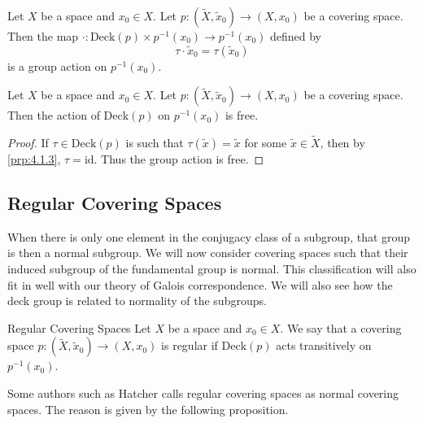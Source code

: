 \documentclass[a4paper]{article}
\begin{document}
\begin{prp}{}{} Let $X$ be a space and $x_0\in X$. Let $p:(\tilde{X},\tilde{x}_0)\to(X,x_0)$ be a covering space. Then the map $\cdot:\text{Deck}(p)\times p^{-1}(x_0)\to p^{-1}(x_0)$ defined by $$\tau\cdot\tilde{x}_0=\tau(\tilde{x}_0)$$ is a group action on $p^{-1}(x_0)$. 
\end{prp}

\begin{prp}{}{} Let $X$ be a space and $x_0\in X$. Let $p:(\tilde{X},\tilde{x}_0)\to(X,x_0)$ be a covering space. Then the action of $\text{Deck}(p)$ on $p^{-1}(x_0)$ is free. \tcbline
\begin{proof}
If $\tau\in\text{Deck}(p)$ is such that $\tau(\tilde{x})=\tilde{x}$ for some $\tilde{x}\in\tilde{X}$, then by \ref{prp:4.1.3}, $\tau=\text{id}$. Thus the group action is free. 
\end{proof}
\end{prp}

\subsection{Regular Covering Spaces}
When there is only one element in the conjugacy class of a subgroup, that group is then a normal subgroup. We will now consider covering spaces such that their induced subgroup of the fundamental group is normal. This classification will also fit in well with our theory of Galois correspondence. We will also see how the deck group is related to normality of the subgroups. 

\begin{defn}{Regular Covering Spaces}{} Let $X$ be a space and $x_0\in X$. We say that a covering space $p:(\tilde{X},\tilde{x}_0)\to(X,x_0)$ is regular if $\text{Deck}(p)$ acts transitively on $p^{-1}(x_0)$. 
\end{defn}

Some authors such as Hatcher calls regular covering spaces as normal covering spaces. The reason is given by the following proposition. 
\end{document}
